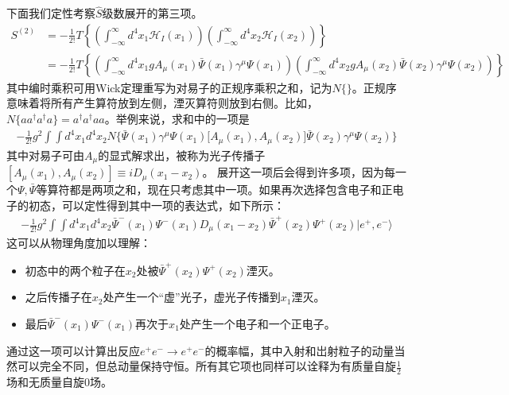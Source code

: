 下面我们定性考察$\hat{S}$级数展开的第三项。
\begin{align}
S^{(2)}&=-\frac{1}{2!}T\left\{ \left( \int_{-\infty}^\infty d^4x_1\mathscr{H}_I(x_1)\right)\left( \int_{-\infty}^\infty d^4x_2\mathscr{H}_I(x_2)\right)\right\}\nonumber\\
&=-\frac{1}{2!}T\left\{ \left( \int_{-\infty}^\infty d^4x_1gA_\mu(x_1)\bar{\Psi}(x_1)\gamma^\mu\Psi(x_1)\right)\left( \int_{-\infty}^\infty d^4x_2gA_\mu(x_2)\bar{\Psi}(x_2)\gamma^\mu\Psi(x_2)\right)\right\} \label{equ9.75}
\end{align}
其中编时乘积可用Wick定理重写为对易子的正规序乘积之和，记为$N\{\}$。正规序意味着将所有产生算符放到左侧，湮灭算符则放到右侧。比如，$N\{aa^\dag a^\dag a\}=a^\dag a^\dag aa$。举例来说，求和中的一项是
\begin{gather*}
-\frac{1}{2!}g^2\int\int d^4x_1 d^4x_2 N\Big\{ \bar{\Psi}(x_1)\gamma^\mu\Psi(x_1) \big[A_\mu(x_1),A_\mu(x_2)\big]\bar{\Psi}(x_2)\gamma^\mu\Psi(x_2)\Big\}
\end{gather*}
其中对易子可由$A_\mu$的显式解求出，被称为光子传播子$[A_\mu(x_1),A_\mu(x_2)]\equiv iD_\mu(x_1-x_2)$。
展开这一项后会得到许多项，因为每一个$\Psi,\bar{\Psi}$等算符都是两项之和，现在只考虑其中一项。如果再次选择包含电子和正电子的初态，可以定性得到其中一项的表达式，如下所示：
\begin{align}\label{equ9.76}
-\frac{1}{2!}g^2\int\int d^4x_1 d^4x_2 \bar{\Psi}^-(x_1)\Psi^-(x_1)D_\mu(x_1-x_2)\bar{\Psi}^+(x_2)\Psi^+(x_2)|e^+,e^-\rangle
\end{align}
这可以从物理角度加以理解：
\begin{itemize}
\item 初态中的两个粒子在$x_2$处被$\bar{\Psi}^+(x_2)\Psi^+(x_2)$湮灭。
\item 之后传播子在$x_2$处产生一个“虚”光子，虚光子传播到$x_1$湮灭。
\item 最后$\bar{\Psi}^-(x_1)\Psi^-(x_1)$再次于$x_1$处产生一个电子和一个正电子。
\end{itemize}
通过这一项可以计算出反应$e^+e^-\to e^+ e^-$的概率幅，其中入射和岀射粒子的动量当然可以完全不同，但总动量保持守恒。所有其它项也同样可以诠释为有质量自旋$\frac{1}{2}$场和无质量自旋$0$场。
